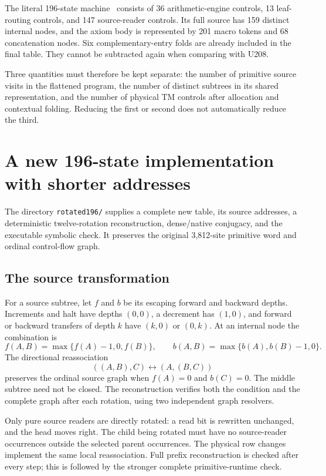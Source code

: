 \documentclass[11pt,letterpaper]{article}
\newcommand{\code}[1]{\texttt{\nolinkurl{#1}}}
\begin{document}
The literal 196-state machine~\cite{pa196} consists of 36 arithmetic-engine controls,
13 leaf-routing controls, and 147 source-reader controls. Its full source
has 159 distinct internal nodes, and the axiom body is represented by
201 macro tokens and 68 concatenation nodes. Six complementary-entry
folds are already included in the final table. They cannot be subtracted
again when comparing with U208.

Three quantities must therefore be kept separate: the number of primitive
source visits in the flattened program, the number of distinct subtrees
in its shared representation, and the number of physical TM controls
after allocation and contextual folding. Reducing the first or second
does not automatically reduce the third.

\section{A new 196-state implementation with shorter addresses}

The directory \code{rotated196/} supplies a complete new table, its source
addresses, a deterministic twelve-rotation reconstruction, dense/native
conjugacy, and the executable symbolic check. It preserves the original
3,812-site primitive word and ordinal control-flow graph.

\subsection{The source transformation}

For a source subtree, let \(f\) and \(b\) be its escaping forward and
backward depths. Increments and halt have depths \((0,0)\), a decrement
has \((1,0)\), and forward or backward transfers of depth \(k\) have
\((k,0)\) or \((0,k)\). At an internal node the combination is
\[
 f(A,B)=\max\{f(A)-1,0,f(B)\},\qquad
 b(A,B)=\max\{b(A),b(B)-1,0\}.
\]
The directional reassociation
\[
 ((A,B),C)\longleftrightarrow (A,(B,C))
\]
preserves the ordinal source graph when \(f(A)=0\) and \(b(C)=0\).
The middle subtree need not be closed. The reconstruction verifies both
the condition and the complete graph after each rotation, using two
independent graph resolvers.

Only pure source readers are directly rotated: a read bit is rewritten
unchanged, and the head moves right. The child being rotated must have
no source-reader occurrences outside the selected parent occurrences.
The physical row changes implement the same local reassociation. Full
prefix reconstruction is checked after every step; this is followed by
the stronger complete primitive-runtime check.
\end{document}
